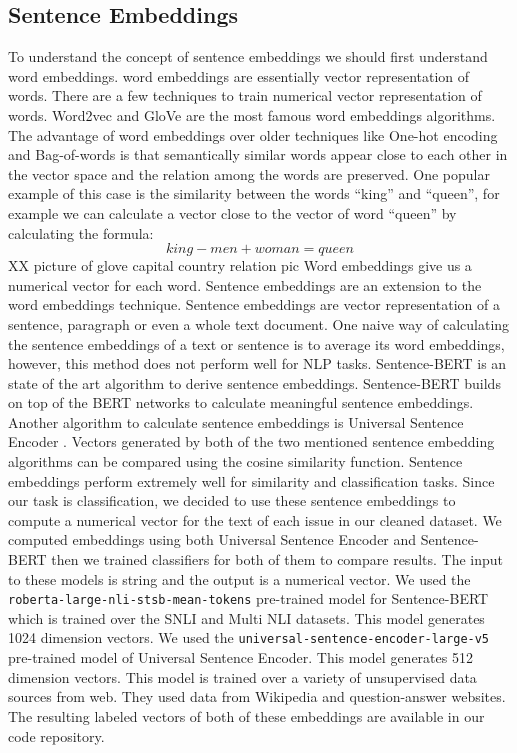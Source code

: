 \documentclass[conference]{IEEEtran}
\begin{document}
\subsection{Sentence Embeddings}
To understand the concept of sentence embeddings we should first understand word embeddings.
word embeddings are essentially vector representation of words. There are a few techniques to train
numerical vector representation of words. Word2vec \cite{mikolov2013efficient,mikolov2013distributed} 
and GloVe \cite{pennington2014glove} are the most famous word embeddings algorithms. The advantage of
word embeddings over older techniques like One-hot encoding and Bag-of-words is that semantically similar
words appear close to each other in the vector space and the relation among the words are preserved.
One popular example of this case is the similarity between the words ``king'' and ``queen'', for example
we can calculate a vector close to the vector of word ``queen'' by calculating the formula:
\begin{equation}
  king-men+woman=queen
\end{equation}
XX picture of glove capital country relation pic
Word embeddings give us a numerical vector for each word. Sentence embeddings are an extension to 
the word embeddings technique. Sentence embeddings are vector representation of a sentence, paragraph 
or even a whole text document. One naive way of calculating the sentence embeddings of a text or sentence 
is to average its word embeddings, however, this method does not perform well for NLP tasks. 
Sentence-BERT \cite{reimers-2019-sentence-bert} is an state of the art 
algorithm to derive sentence embeddings. Sentence-BERT builds on top of the BERT \cite{devlin2019bert} networks 
to calculate meaningful sentence embeddings. Another algorithm to calculate sentence embeddings is 
Universal Sentence Encoder \cite{cer2018universal}. Vectors generated by both of the two mentioned sentence
embedding algorithms can be compared using the cosine similarity function. Sentence embeddings perform
extremely well for similarity and classification tasks. Since our task is classification, we decided to 
use these sentence embeddings to compute a numerical vector for the text of each issue in our 
cleaned dataset. We computed embeddings using both Universal Sentence Encoder and Sentence-BERT then we trained
classifiers for both of them to compare results. The input to these models is string and the output is 
a numerical vector. We used the \verb|roberta-large-nli-stsb-mean-tokens| pre-trained 
model for Sentence-BERT which is trained over the SNLI \cite{snli:emnlp2015} and Multi NLI \cite{N18-1101} datasets. 
This model generates 1024 dimension vectors. We used the 
\verb|universal-sentence-encoder-large-v5| pre-trained model of Universal Sentence Encoder. This model generates 
512 dimension vectors. This model is trained over a variety of unsupervised data sources from web. They used data
from Wikipedia and question-answer websites. The resulting labeled vectors of both of these embeddings 
are available in our code repository.
\end{document}
